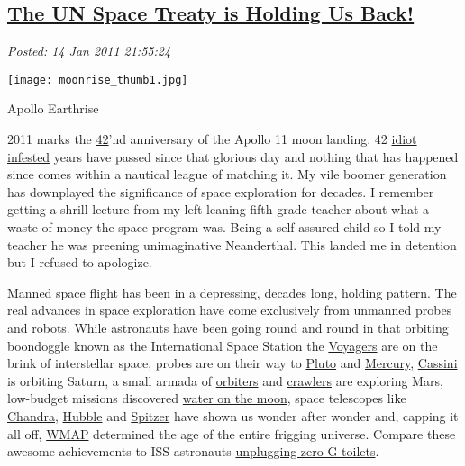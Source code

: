 %

\subsection*{\href{http://bakerjd99.wordpress.com/2011/01/14/the-un-space-treaty-is-holding-us-back/}{The UN Space Treaty is Holding Us Back!}}


\noindent\emph{Posted: 14 Jan 2011 21:55:24}
\vspace{6pt}


\captionsetup[floatingfigure]{labelformat=empty}
\begin{floatingfigure}[l]{0.25\textwidth}
\centering
\href{http://bakerjd99.files.wordpress.com/2011/01/moonrise1.jpg}{\texttt{[image: moonrise\_thumb1.jpg]}}
\caption{Apollo  Earthrise}
\label{fig:1022X0}
\end{floatingfigure} 2011 marks the \href{http://www.youtube.com/watch?v=aboZctrHfK8}{42}'nd
anniversary of the Apollo 11 moon landing. 42
\href{http://www.newser.com/story/comments/64908/moon-landing-denier-exposed-as-a-cheat.html}{idiot
infested} years have passed since that glorious day and nothing that has
happened since comes within a nautical league of matching it. My vile
boomer generation has downplayed the significance of space exploration
for decades. I remember getting a shrill lecture from my left leaning
fifth grade teacher about what a waste of money the space program was.
Being a self-assured child so I told my teacher he was preening
unimaginative Neanderthal. This landed me in detention but I refused to
apologize.

Manned space flight has been in a depressing, decades long, holding
pattern. The real advances in space exploration have come exclusively
from unmanned probes and robots. While astronauts have been going round
and round in that orbiting boondoggle known as the International Space
Station the \href{http://voyager.jpl.nasa.gov/}{Voyagers} are on the
brink of interstellar space, probes are on their way to
\href{http://pluto.jhuapl.edu/}{Pluto} and
\href{http://messenger.jhuapl.edu/}{Mercury},
\href{http://saturn.jpl.nasa.gov/}{Cassini} is orbiting Saturn, a small
armada of
\href{http://www.esa.int/SPECIALS/Mars\_Express/index.html}{orbiters}
and \href{http://marsrover.nasa.gov/home/}{crawlers} are exploring Mars,
low-budget missions discovered
\href{http://online.wsj.com/article/SB10001424052702303339504575566194097878552.html}{water
on the moon}, space telescopes like
\href{http://chandra.harvard.edu/}{Chandra},
\href{http://hubblesite.org/hubble\_20/}{Hubble} and
\href{http://www.spitzer.caltech.edu/}{Spitzer} have shown us wonder
after wonder and, capping it all off,
\href{http://map.gsfc.nasa.gov/}{WMAP} determined the age of the entire
frigging universe. Compare these awesome achievements to ISS astronauts
\href{http://www.nationalledger.com/cgi-bin/artman/exec/view.cgi?archive=26\&num=20926}{unplugging
zero-G toilets}.

